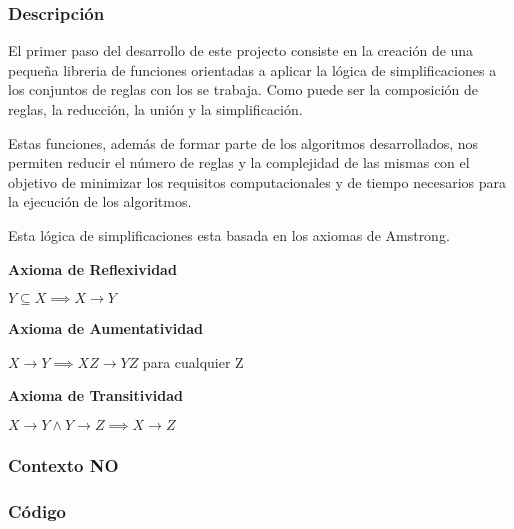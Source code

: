 \subsubsection{Descripci\'on} 
El primer paso del desarrollo de este projecto consiste en la creaci\'on de una peque\~na libreria de funciones
orientadas a aplicar la l\'ogica de simplificaciones a los conjuntos de reglas con los se trabaja. Como 
puede ser la composici\'on de reglas, la reducci\'on, la uni\'on y la simplificaci\'on.

Estas funciones, adem\'as de formar parte de los algoritmos desarrollados, nos permiten reducir el n\'umero de 
reglas y la complejidad de las mismas con el objetivo de minimizar los requisitos computacionales y de tiempo
necesarios para la ejecuci\'on de los algoritmos.

Esta l\'ogica de simplificaciones esta basada en los axiomas de Amstrong.

\textbf{Axioma de Reflexividad}

\begin{center}
    \(Y \subseteq X \implies X \to Y \)
\end{center}

\textbf{Axioma de Aumentatividad}

\begin{center}
    \(X \to Y \implies XZ \to YZ \) para cualquier Z
\end{center}

\textbf{Axioma de Transitividad}

\begin{center}
    \(X \to Y \wedge Y \to Z \implies X \to Z \)
\end{center}



\subsubsection{Contexto NO} 
\subsubsection{C\'odigo} 

